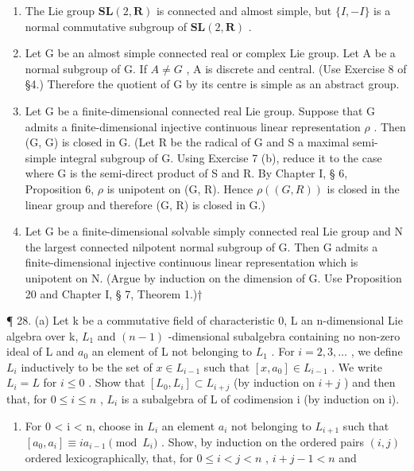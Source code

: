\begin{enumerate}
\def\labelenumi{\arabic{enumi}.}
\setcounter{enumi}{23}
\item
  The Lie group \(\mathbf{SL}(2,\mathbf{R})\) is connected and almost simple, but \(\{I,-I\}\) is a normal commutative subgroup of \(\mathbf{SL}(2,\mathbf{R})\) .
\item
  Let G be an almost simple connected real or complex Lie group. Let A be a normal subgroup of G. If \(A \neq G\) , A is discrete and central. (Use Exercise 8 of §4.) Therefore the quotient of G by its centre is simple as an abstract group.
\item
  Let G be a finite-dimensional connected real Lie group. Suppose that G admits a finite-dimensional injective continuous linear representation \(\rho\) . Then (G, G) is closed in G. (Let R be the radical of G and S a maximal semi-simple integral subgroup of G. Using Exercise 7 (b), reduce it to the case where G is the semi-direct product of S and R. By Chapter I, § 6, Proposition 6, \(\rho\) is unipotent on (G, R). Hence \(\rho((G, R))\) is closed in the linear group and therefore (G, R) is closed in G.)
\item
  Let G be a finite-dimensional solvable simply connected real Lie group and N the largest connected nilpotent normal subgroup of G. Then G admits a finite-dimensional injective continuous linear representation which is unipotent on N. (Argue by induction on the dimension of G. Use Proposition 20 and Chapter I, § 7, Theorem 1.)†
\end{enumerate}

¶ 28. (a) Let k be a commutative field of characteristic 0, L an n-dimensional Lie algebra over k, \(L_{1}\) and \((n-1)\) -dimensional subalgebra containing no non-zero ideal of L and \(a_{0}\) an element of L not belonging to \(L_{1}\) . For \(i=2,3,\ldots\) , we define \(L_{i}\) inductively to be the set of \(x\in L_{i-1}\) such that \([x,a_{0}]\in L_{i-1}\) . We write \(L_{i}=L\) for \(i\leqslant0\) . Show that \([L_{0},L_{i}]\subset L_{i+j}\) (by induction on \(i+j\) ) and then that, for \(0\leqslant i\leqslant n\) , \(L_{i}\) is a subalgebra of L of codimension i (by induction on i).

\begin{enumerate}
\def\labelenumi{(\alph{enumi})}
\setcounter{enumi}{1}
\tightlist
\item
  For 0 \textless{} i \textless{} n, choose in \(L_{i}\) an element \(a_{i}\) not belonging to \(L_{i+1}\) such that \([a_{0}, a_{i}] \equiv ia_{i-1} \pmod{L_{i}}\) . Show, by induction on the ordered pairs \((i, j)\) ordered lexicographically, that, for \(0 \leqslant i < j < n\) , \(i + j - 1 < n\) and
\end{enumerate}

